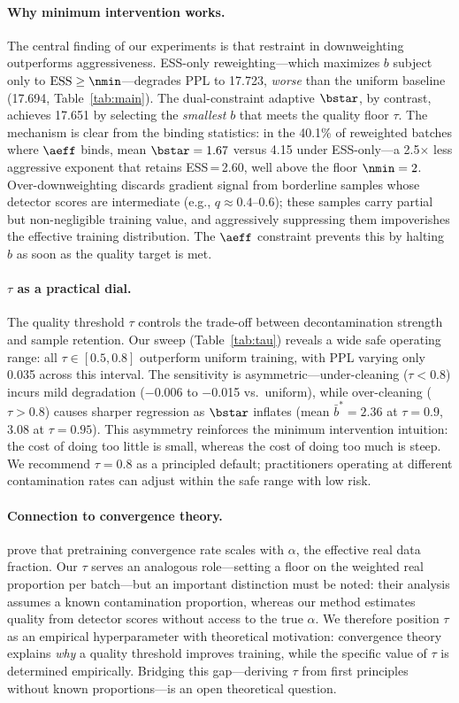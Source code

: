 \paragraph{Why minimum intervention works.}
The central finding of our experiments is that restraint in downweighting outperforms aggressiveness.
ESS-only reweighting---which maximizes $b$ subject only to $\mathrm{ESS} \geq \nmin$---degrades PPL to 17.723, \emph{worse} than the uniform baseline (17.694, Table~\ref{tab:main}).
The dual-constraint adaptive $\bstar$, by contrast, achieves 17.651 by selecting the \emph{smallest} $b$ that meets the quality floor $\tau$.
The mechanism is clear from the binding statistics: in the 40.1\% of reweighted batches where $\aeff$ binds, mean $\bstar = 1.67$ versus 4.15 under ESS-only---a 2.5$\times$ less aggressive exponent that retains ESS\,=\,2.60, well above the floor $\nmin = 2$.
Over-downweighting discards gradient signal from borderline samples whose detector scores are intermediate (e.g., $q \approx 0.4$--$0.6$); these samples carry partial but non-negligible training value, and aggressively suppressing them impoverishes the effective training distribution.
The $\aeff$ constraint prevents this by halting $b$ as soon as the quality target is met.

\paragraph{$\tau$ as a practical dial.}
The quality threshold $\tau$ controls the trade-off between decontamination strength and sample retention.
Our sweep (Table~\ref{tab:tau}) reveals a wide safe operating range: all $\tau \in [0.5, 0.8]$ outperform uniform training, with PPL varying only 0.035 across this interval.
The sensitivity is asymmetric---under-cleaning ($\tau < 0.8$) incurs mild degradation ($-$0.006 to $-$0.015 vs.\ uniform), while over-cleaning ($\tau > 0.8$) causes sharper regression as $\bstar$ inflates (mean $\bar{b}^* = 2.36$ at $\tau{=}0.9$, 3.08 at $\tau{=}0.95$).
This asymmetry reinforces the minimum intervention intuition: the cost of doing too little is small, whereas the cost of doing too much is steep.
We recommend $\tau = 0.8$ as a principled default; practitioners operating at different contamination rates can adjust within the safe range with low risk.

\paragraph{Connection to convergence theory.}
\citet{wang_2026_survive_contamination} prove that pretraining convergence rate scales with $\alpha$, the effective real data fraction.
Our $\tau$ serves an analogous role---setting a floor on the weighted real proportion per batch---but an important distinction must be noted: their analysis assumes a known contamination proportion, whereas our method estimates quality from detector scores without access to the true $\alpha$.
We therefore position $\tau$ as an empirical hyperparameter with theoretical motivation: convergence theory explains \emph{why} a quality threshold improves training, while the specific value of $\tau$ is determined empirically.
Bridging this gap---deriving $\tau$ from first principles without known proportions---is an open theoretical question.

